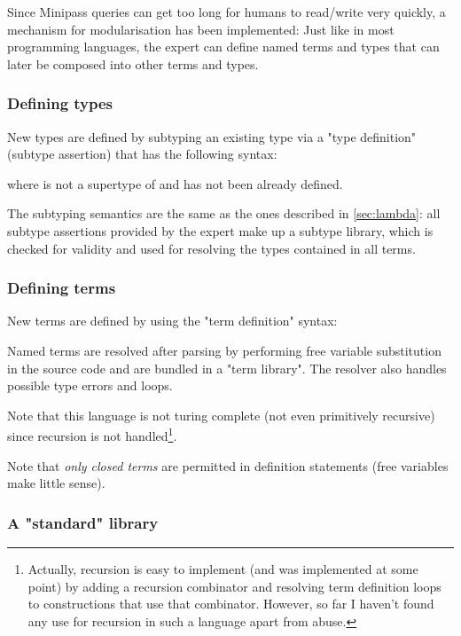 \documentclass[main.tex]{subfiles}
\begin{document}
Since Minipass queries can get too long for humans to read/write very quickly,
a mechanism for modularisation has been implemented: Just like in most
programming languages, the expert can define
named terms and types that can later be composed into other terms and types.

\subsubsection{Defining types}\label{sec:definingtypes}
New types are defined by subtyping an existing type via a "type definition"
(subtype assertion) that has the following syntax:
\begin{center}
\end{center}
where  is not a supertype of  and has not been
already defined.

The subtyping semantics
are the same as the ones described in \cref{sec:lambda}: all subtype assertions
provided by the expert
make up a subtype library, which is checked for validity and used for resolving
the types contained in all terms.

\subsubsection{Defining terms}
New terms are defined by using the "term definition" syntax:
\begin{center}
\end{center}

Named terms are resolved after parsing by performing free variable substitution
in the source code and are bundled in a "term library". The resolver also
handles possible type errors and loops.

Note that this language is not turing complete (not even primitively recursive)
since recursion is not handled\footnote{
    Actually, recursion is easy to implement (and was implemented at some point)
    by adding a recursion combinator
    and resolving term definition loops to constructions that use that combinator.
    However, so far I haven't found any use for recursion in such a language
    apart from abuse.
}.

Note that \emph{only closed terms} are permitted in definition statements
(free variables make little sense).

\subsubsection{A "standard" library}
\label{stdlib}
\end{document}
